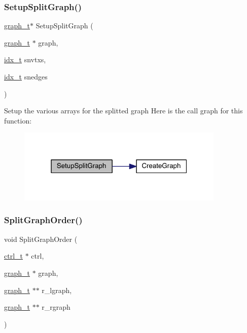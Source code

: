 \subsubsection{\texorpdfstring{Setup\+Split\+Graph()}{SetupSplitGraph()}}
{\footnotesize\ttfamily \hyperlink{a00734}{graph\+\_\+t}$\ast$ Setup\+Split\+Graph (\begin{DoxyParamCaption}\item[{\hyperlink{a00734}{graph\+\_\+t} $\ast$}]{graph,  }\item[{\hyperlink{a00876_aaa5262be3e700770163401acb0150f52}{idx\+\_\+t}}]{snvtxs,  }\item[{\hyperlink{a00876_aaa5262be3e700770163401acb0150f52}{idx\+\_\+t}}]{snedges }\end{DoxyParamCaption})}

Setup the various arrays for the splitted graph Here is the call graph for this function\+:\nopagebreak
\begin{figure}[H]
\begin{center}
\leavevmode
\includegraphics[width=280pt]{a00945_ad1dfd83fc2dc5e9f855c2d86b960c809_cgraph}
\end{center}
\end{figure}
\mbox{\label{a00945_a2554253b42e739ac3bb63e676741e1cd}} 
\subsubsection{\texorpdfstring{Split\+Graph\+Order()}{SplitGraphOrder()}}
{\footnotesize\ttfamily void Split\+Graph\+Order (\begin{DoxyParamCaption}\item[{\hyperlink{a00742}{ctrl\+\_\+t} $\ast$}]{ctrl,  }\item[{\hyperlink{a00734}{graph\+\_\+t} $\ast$}]{graph,  }\item[{\hyperlink{a00734}{graph\+\_\+t} $\ast$$\ast$}]{r\+\_\+lgraph,  }\item[{\hyperlink{a00734}{graph\+\_\+t} $\ast$$\ast$}]{r\+\_\+rgraph }\end{DoxyParamCaption})}

